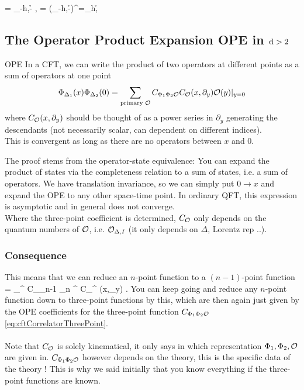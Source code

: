  \be 
 \ket{\phi} = \phi_{-h,-\h} , \; \bra{\phi}= (\phi_{-h,-\h})^\dagger =\phi_{h,\h}
 \ee 
 
 
 
 
 
 
 
 
 
 
 
 
 
  \subsection{The Operator Product Expansion OPE in $\mathrm{d}>2$}
  \begin{mybox}{OPE}
  	In a CFT, we can write the product of two operators at different points as a sum of operators at one point
 \begin{equation}
 \label{eq:cftOPE}
 \Phi_{\Delta_1}(x) \Phi_{\Delta_2}(0) = \sum_{\text{primary } \mathcal{O}} C_{\Phi_1 \Phi_2 \mathcal{O}} C_{\mathcal{O}}(x,\partial_y) \mathcal{O}(y) |_{y=0} 
 \end{equation}
 where $C_{\mathcal{O}}(x,\partial_y)$ should be thought of as a power series in $\partial_y$ generating the descendants (not necessarily scalar, can dependent on different indices).\\
 This is convergent as long as there are no operators between $x$ and $0$.
 \end{mybox}
The proof stems from the operator-state equivalence: You can expand the product of states via the completeness relation to a sum of states, i.e. a sum of operators. We have translation invariance, so we can simply put $0 \rightarrow x$ and expand the OPE to any other space-time point. In ordinary QFT, this expression is asymptotic and in general does not converge.\\
Where the three-point coefficient is determined, $C_{\mathcal{O}}$ only depends on the quantum numbers of $\mathcal{O}$, i.e. $\mathcal{O}_{\Delta,I}$ (it only depends on $\Delta$, Lorentz rep ..).\\

\subsubsection{Consequence}
This means that we can reduce an $n$-point function to a $(n-1)$-point function
\bse 
{} = \sum_{\mO^\prime} C_{\mO_{n-1} \mO_n \mO^\prime} C_{\mO^\prime} (x,\partial_y) .
\ese 
You can keep going and reduce any $n$-point function down to three-point functions by this, which are then again just given by the OPE coefficients for the three-point function $C_{\Phi_1 \Phi_2 \mathcal{O}}$ \ref{eq:cftCorrelatorThreePoint}.\\
\\
Note that $C_{\mathcal{O}}$ is solely kinematical, it only says in which representation $\Phi_1,\Phi_2,\mathcal{O}$ are given in. $C_{\Phi_1\Phi_2 \mathcal{O}}$ however depends on the theory, this is the specific data of the theory ! This is why we said initially that you know everything if the three-point functions are known.

